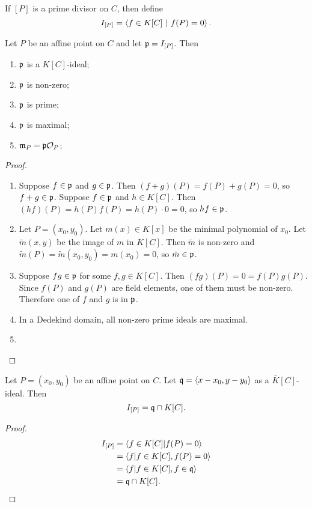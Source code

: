 If $[P]$ is a prime divisor on $C$, then define
\[ I_{[P]} = \pid{ f \in K[C] ~|~ f(P) = 0 }. \]

\begin{proposition}
  Let $P$ be an affine point on $C$ and let $\frak p = I_{[P]}$. Then
  \begin{enumerate}[label=(\roman*)]
    \item $\frak p$ is a $K[C]$-ideal;
    \item $\frak p$ is non-zero;
    \item $\frak p$ is prime;
    \item $\frak p$ is maximal;
    \item $\frak m_P = \frak p \cal O_P$;
  \end{enumerate}
\end{proposition}
\begin{proof}
  \begin{enumerate}[label=(\roman*)]
    \item
    Suppose $f \in \frak p$ and $g \in \frak p$.
    Then $(f + g)(P) = f(P) + g(P) = 0$, so $f + g \in \frak p$.
    Suppose $f \in \frak p$ and $h \in K[C]$.
    Then $(hf)(P) = h(P)f(P) = h(P)\cdot 0 = 0$, so $hf \in \frak p$.
    
    \item
    Let $P = (x_0, y_0)$.
    Let $m(x) \in K[x]$ be the minimal polynomial of $x_0$.
    Let $\tilde m(x,y)$ be the image of $m$ in $K[C]$.
    Then $\tilde m$ is non-zero and $\tilde m(P) = \tilde m(x_0, y_0) = m(x_0) = 0$,
    so $\tilde m \in \frak p$.
    
    \item
    Suppose $fg \in \frak p$ for some $f, g \in K[C]$.
    Then $(fg)(P) = 0 = f(P)g(P)$.
    Since $f(P)$ and $g(P)$ are field elements, one of them must be non-zero.
    Therefore one of $f$ and $g$ is in $\frak p$.
    
    \item
    In a Dedekind domain, all non-zero prime ideals are maximal.
    
    \item
  \end{enumerate}
\end{proof}
\begin{proposition}
  Let $P = (x_0, y_0)$ be an affine point on $C$.
  Let $\frak q = \pid{x - x_0, y - y_0}$ as a $\bar K[C]$-ideal. Then
  \[ I_{[P]} = \frak q \cap K[C]. \]
\end{proposition}
\begin{proof}
  \begin{align*}
    I_{[P]}
      &= \pid{ f \in K[C] | f(P) = 0 } \\
      &= \pid{ f | f \in K[C], f(P) = 0 } \\
      &= \pid{ f | f \in K[C], f \in \frak q } \\
      &= \frak q \cap K[C].
  \end{align*}
\end{proof}

